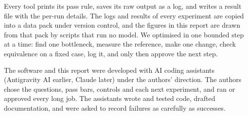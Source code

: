 Every tool prints its pass rule, saves its raw output as a log, and writes a result file with the per-run details. The logs and results of every experiment are copied into a data pack under version control, and the figures in this report are drawn from that pack by scripts that run no model. We optimised in one bounded step at a time: find one bottleneck, measure the reference, make one change, check equivalence on a fixed case, log it, and only then approve the next step.

The software and this report were developed with AI coding assistants (Antigravity AI earlier, Claude later) under the authors' direction. The authors chose the questions, pass bars, controls and each next experiment, and ran or approved every long job. The assistants wrote and tested code, drafted documentation, and were asked to record failures as carefully as successes. 
